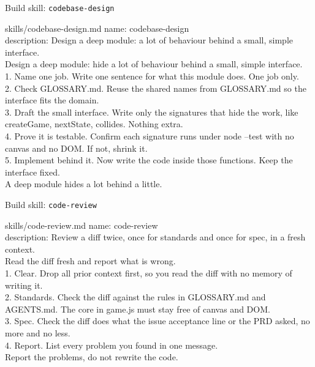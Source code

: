 \begin{frame}{Build skill: \texttt{codebase-design}}
  \begin{tdcodet}{skills/codebase-design.md}
    name: codebase-design\\
    description: Design a deep module: a lot of behaviour behind a small, simple interface.\\[3pt]
    Design a deep module: hide a lot of behaviour behind a small, simple interface.\\[3pt]
    1. Name one job. Write one sentence for what this module does. One job only.\\
    2. Check GLOSSARY.md. Reuse the shared names from GLOSSARY.md so the interface fits the domain.\\
    3. Draft the small interface. Write only the signatures that hide the work, like createGame, nextState, collides. Nothing extra.\\
    4. Prove it is testable. Confirm each signature runs under node --test with no canvas and no DOM. If not, shrink it.\\
    5. Implement behind it. Now write the code inside those functions. Keep the interface fixed.\\[3pt]
    A deep module hides a lot behind a little.
  \end{tdcodet}
\end{frame}

\begin{frame}{Build skill: \texttt{code-review}}
  \begin{tdcodet}{skills/code-review.md}
    name: code-review\\
    description: Review a diff twice, once for standards and once for spec, in a fresh context.\\[3pt]
    Read the diff fresh and report what is wrong.\\[3pt]
    1. Clear. Drop all prior context first, so you read the diff with no memory of writing it.\\
    2. Standards. Check the diff against the rules in GLOSSARY.md and AGENTS.md. The core in game.js must stay free of canvas and DOM.\\
    3. Spec. Check the diff does what the issue acceptance line or the PRD asked, no more and no less.\\
    4. Report. List every problem you found in one message.\\[3pt]
    Report the problems, do not rewrite the code.
  \end{tdcodet}
\end{frame}

